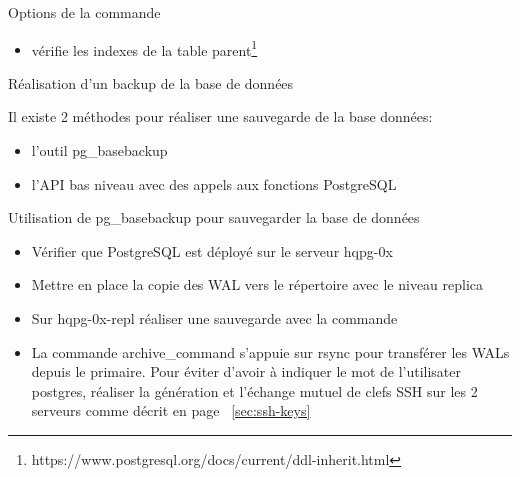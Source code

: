 
\begin{frame}{Options de la commande }

\begin{itemize}
   \item {} vérifie les indexes de la table parent\footnote{https://www.postgresql.org/docs/current/ddl-inherit.html}
\end{itemize}

\end{frame}


\begin{frame}{Réalisation d'un backup de la base de données}

Il existe 2 méthodes pour réaliser une sauvegarde de la base données:
\begin{itemize}
   \item l'outil \textsf{pg\_basebackup}
   \item l'API bas niveau avec des appels aux fonctions PostgreSQL
\end{itemize}

\end{frame}


\begin{frame}{Utilisation de \textsf{pg\_basebackup} pour sauvegarder la base de données}

\begin{itemize}
   \item Vérifier que PostgreSQL est déployé sur le serveur \textsf{hqpg-0x}
   \item Mettre en place la copie des WAL vers le répertoire  avec le niveau \textsf{replica}
   \item Sur \textsf{hqpg-0x-repl} réaliser une sauvegarde avec la commande 
   \item La commande \textsf{archive\_command} s'appuie sur rsync pour transférer les WALs depuis le primaire. Pour éviter d'avoir à indiquer le mot de l'utilisater postgres, réaliser la génération et l'échange mutuel de clefs SSH sur les 2 serveurs comme décrit en page ~\ref{sec:ssh-keys}


\end{itemize}

\end{frame}


